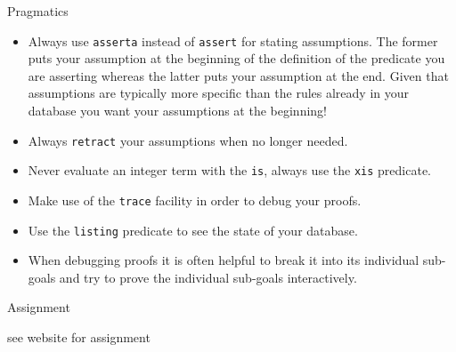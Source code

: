 \documentclass{beamer}
\begin{document}
\begin{frame}[fragile]{Pragmatics}
\small
\begin{itemize}
\item Always use {\tt asserta} instead of {\tt assert} for stating assumptions.  The former puts your assumption at the beginning of the definition of the predicate you are asserting whereas the latter puts your 
assumption at the end.  Given that assumptions are typically more specific than the rules already in your database you want your assumptions at the beginning!

\item Always {\tt retract} your assumptions when no longer needed.

\item Never evaluate an integer term with the {\tt is}, always use the {\tt xis} predicate.  

\item Make use of the {\tt trace} facility in order to debug your proofs.

\item Use the {\tt listing} predicate to see the state of your database.

\item When debugging proofs it is often helpful to break it into its individual sub-goals and try to
prove the individual sub-goals interactively.

\end{itemize}
\end{frame}

\begin{frame}[fragile]{Assignment}

see website for assignment
\end{frame}
\end{document}
